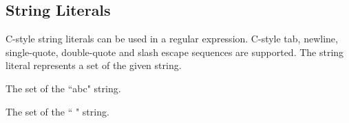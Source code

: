 
\subsection{String Literals}
{
	C-style string literals can be used in a regular expression.
	C-style tab, newline, single-quote, double-quote and slash escape sequences
	are supported.
	The string literal represents a set of the given string.
	
	\begin{itemize}
	{
		\item[\texttt{"abc"}] The set of the ``abc" string.
		
		\item[\texttt{" "}] The set of the `` " string.
	}
	\end{itemize}
}
